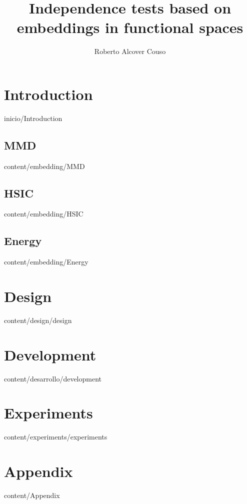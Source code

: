 \documentclass[epsbased,copyright,final,english,printable,covers,extendedindex,firstnumbered,tfg,gnuplot]{tfgtfmthesisuam}
\title[Independence tests]{Independence tests based on embeddings in functional spaces}
\author{Roberto Alcover Couso}
\begin{document}
\chapter{Introduction\label{CAP:INTRODUCCION}}{inicio/Introduction}
	\section{MMD\label{SEC:MMD}}{content/embedding/MMD}
	\section{HSIC\label{SEC:HSIC}}{content/embedding/HSIC}
	\section{Energy\label{SEC:Energy}}{content/embedding/Energy}
\chapter{Design\label{CAP:DEV}}{content/design/design}
\chapter{Development\label{CAP:DEVPMT}}{content/desarrollo/development}
\chapter{Experiments\label{Cap:Experiments}}{content/experiments/experiments}
\chapter{Appendix\label{Apendix}}{content/Appendix}
\end{document}
